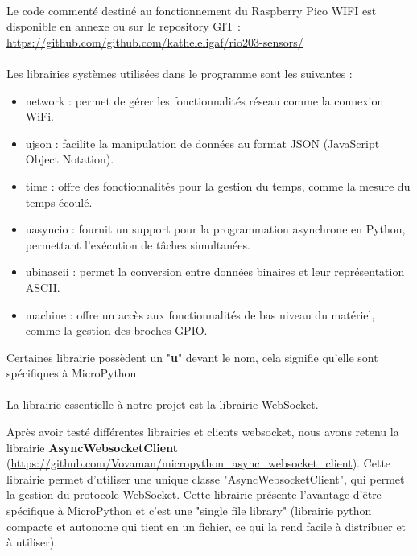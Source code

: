 \paragraph*{}
Le code commenté destiné au fonctionnement du Raspberry Pico WIFI est disponible en annexe ou sur le repository GIT : \url{https://github.com/github.com/katheleligaf/rio203-sensors/}

 
\paragraph*{}
Les librairies systèmes utilisées dans le programme sont les suivantes : 
\begin{itemize}
    \item network : permet de gérer les fonctionnalités réseau comme la connexion WiFi. 
    \item ujson : facilite la manipulation de données au format JSON (JavaScript Object Notation).
    \item time : offre des fonctionnalités pour la gestion du temps, comme la mesure du temps écoulé.
    \item uasyncio : fournit un support pour la programmation asynchrone en Python, permettant l'exécution de tâches simultanées.
    \item ubinascii : permet la conversion entre données binaires et leur représentation ASCII.
    \item machine : offre un accès aux fonctionnalités de bas niveau du matériel, comme la gestion des broches GPIO.
\end{itemize}

Certaines librairie possèdent un "\textbf{u}" devant le nom, cela signifie qu'elle sont spécifiques à MicroPython.


\paragraph*{}
La librairie essentielle à notre projet est la librairie WebSocket.

Après avoir testé différentes librairies et clients websocket, nous avons retenu la librairie \textbf{AsyncWebsocketClient} (\url{https://github.com/Vovaman/micropython_async_websocket_client}). Cette librairie permet d'utiliser une unique classe "AsyncWebsocketClient", qui permet la gestion du protocole WebSocket.
Cette librairie présente l'avantage d'être spécifique à MicroPython et c'est une "single file library" (librairie python compacte et autonome qui tient en un fichier, ce qui la rend facile à distribuer et à utiliser).